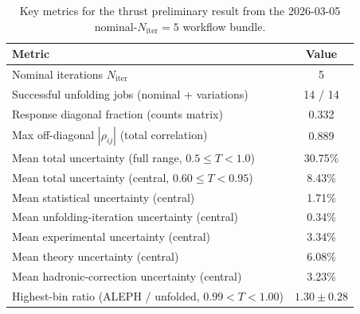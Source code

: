 \begin{table}[t!]
\centering
\begin{tabular}{l c}
\hline
Metric & Value \\
\hline
Nominal iterations $N_{\mathrm{iter}}$ & 5 \\
Successful unfolding jobs (nominal + variations) & 14 / 14 \\
Response diagonal fraction (counts matrix) & 0.332 \\
Max off-diagonal $|\rho_{ij}|$ (total correlation) & 0.889 \\
Mean total uncertainty (full range, $0.5\le T<1.0$) & 30.75\% \\
Mean total uncertainty (central, $0.60\le T<0.95$) & 8.43\% \\
Mean statistical uncertainty (central) & 1.71\% \\
Mean unfolding-iteration uncertainty (central) & 0.34\% \\
Mean experimental uncertainty (central) & 3.34\% \\
Mean theory uncertainty (central) & 6.08\% \\
Mean hadronic-correction uncertainty (central) & 3.23\% \\
Highest-bin ratio (ALEPH / unfolded, $0.99<T<1.00$) & $1.30 \pm 0.28$ \\
\hline
\end{tabular}
\caption{Key metrics for the thrust preliminary result from the 2026-03-05 nominal-$N_{\mathrm{iter}}=5$ workflow bundle.}
\label{tab:results_key_metrics}
\end{table}
